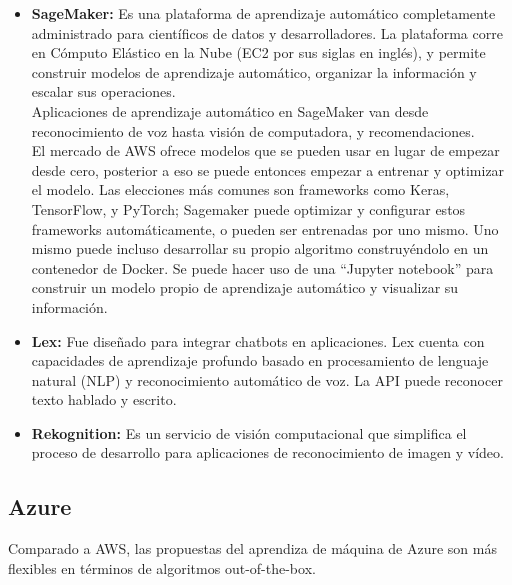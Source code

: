 \documentclass[12pt, a4paper, titlepage]{report}
\begin{document}
		\begin{itemize}
			\item \textbf{SageMaker:} Es una plataforma de aprendizaje automático completamente administrado para científicos de datos y desarrolladores. La plataforma corre en Cómputo Elástico en la  Nube (EC2 por sus siglas en inglés), y permite construir modelos de aprendizaje automático, organizar la información y escalar sus operaciones. \\
			Aplicaciones de aprendizaje automático en SageMaker van desde reconocimiento de voz hasta visión de computadora, y recomendaciones.\\ 
			El mercado de AWS ofrece modelos que se pueden usar en lugar de empezar desde cero, posterior a eso se puede entonces empezar a entrenar y optimizar el modelo. Las elecciones más comunes son frameworks como Keras, TensorFlow, y PyTorch; Sagemaker puede optimizar y configurar estos frameworks automáticamente, o pueden ser entrenadas por uno mismo. Uno mismo puede incluso desarrollar su propio algoritmo construyéndolo en un contenedor de Docker. Se puede hacer uso de una “Jupyter notebook” para construir un modelo propio de aprendizaje automático y visualizar su información.
			
			\item \textbf{Lex:} Fue diseñado para integrar chatbots en aplicaciones. Lex cuenta con capacidades de aprendizaje profundo basado en procesamiento de lenguaje natural (NLP) y reconocimiento automático de voz. La API puede reconocer texto hablado y escrito. 
			\item \textbf{Rekognition:} Es un servicio de visión computacional que simplifica el proceso de desarrollo para aplicaciones de reconocimiento de imagen y vídeo.
		\end{itemize}
		
		\subsection{Azure}
		Comparado a AWS, las propuestas del aprendiza de máquina de Azure son más flexibles en términos de algoritmos out-of-the-box.
		
\end{document}

